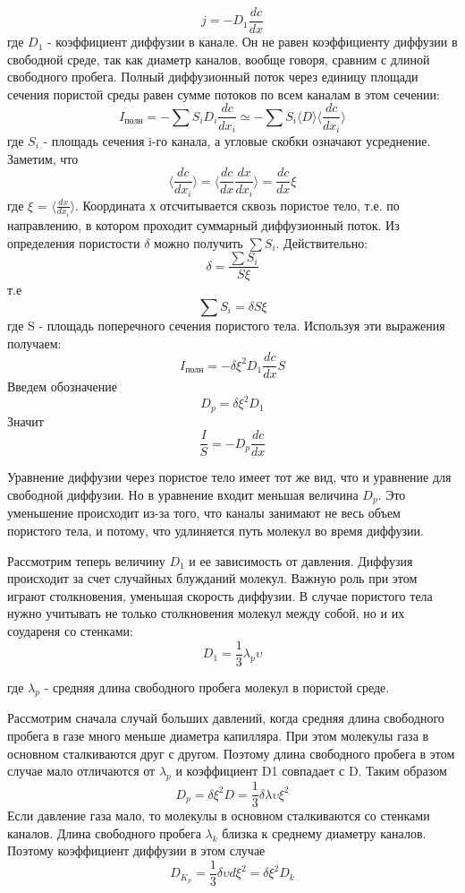 \documentclass[a4paper,12pt]{article}
\begin{document}
\begin{equation}
j=-D_1\frac{dc}{dx}
\end{equation}
где $D_{1}$ - коэффициент диффузии в канале.  Он не равен коэффициенту диффузии в свободной среде, так как диаметр каналов, вообще говоря, сравним с длиной свободного пробега. Полный диффузионный поток через единицу площади сечения пористой среды равен сумме потоков по всем каналам в этом сечении:
\[ I_{полн} = -\sum S_{i} D_{i}\frac{dc}{dx_{i}} \simeq -\sum S_{i} \langle D\rangle \langle \frac{dc}{dx_{i}}\rangle  \]
где $S_i$ - площадь сечения i-го канала, а угловые скобки означают усреднение. Заметим, что
\[\langle \frac{dc}{dx_{i}}\rangle  = \langle \frac{dc}{dx}\frac{dx}{dx_{i}}\rangle  = \frac{dc}{dx} \xi  \]
где $\xi $ = $\langle\frac{dx}{dx_{i}} \rangle $. Координата х отсчитывается сквозь пористое тело, т.е. по направлению, в котором проходит суммарный диффузионный поток. Из определения пористости $\delta $ можно получить $\sum S_i$. Действительно:
\[ \delta = \frac{\sum S_i}{S\xi } \]
т.е 
\[ \sum S_i = \delta S \xi \]
где S - площадь поперечного сечения пористого тела. Используя эти выражения получаем:
\[ I_{полн} = -\delta \xi ^{2} D_{1} \frac{dc}{dx} S\]
Введем обозначение
\[ D_{p} = \delta \xi ^{2} D_{1}\]
Значит
\[ \frac{I}{S} = - D_{p} \frac{dc}{dx}\]

Уравнение диффузии через пористое тело имеет тот же вид, что и уравнение для свободной диффузии. Но в уравнение входит меньшая величина $D_p$. Это уменьшение происходит из-за того, что каналы занимают не весь объем пористого тела, и потому, что удлиняется путь молекул во время диффузии.

Рассмотрим теперь величину $D_1$ и ее зависимость от давления. Диффузия происходит за счет случайных блужданий молекул. Важную роль при этом играют столкновения, уменьшая скорость диффузии. В случае пористого тела нужно учитывать не только столкновения молекул между собой, но и их соудареня со стенками:
\[ D_1 = \frac{1}{3} \lambda_{p} \upsilon \]

где $\lambda_{p}$ - средняя длина свободного пробега молекул в пористой среде.

Рассмотрим сначала случай больших давлений, когда средняя длина свободного пробега в газе  много меньше диаметра капилляра. При этом молекулы газа в основном сталкиваются друг с другом. Поэтому длина свободного пробега в этом случае мало отличаются от $\lambda_{p} $ и коэффициент  D1 совпадает с D. Таким образом 
\[ D_p = \delta  \xi^{2} D = \frac{1}{3} \delta \lambda \upsilon \xi^{2}\]
Если давление газа мало, то молекулы в основном сталкиваются со стенками каналов. Длина свободного пробега $\lambda_k$ близка к среднему диаметру каналов. Поэтому коэффициент диффузии в этом случае 
\[ D_{K_{p}} = \frac{1}{3} \delta \upsilon d \xi^{2} = \delta \xi^{2} D_k\]
\end{document}
